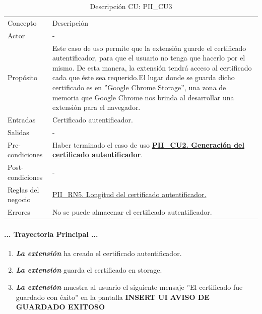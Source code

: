 \documentclass[12pt, a4paper, titlepage]{report}
\begin{document}
				\begin{table}[H]
    				\begin{tabular}{ |p{3.5cm}||p{9.5cm}|}
    					\hline
    					\rowcolor{guindapoli}  					\multicolumn{2}{|c|}{\textbf{\textcolor{white}{Caso de uso: PII\_CU3. Almacenamiento del certificado autentificador.}}}\\
    					\hline
    					\rowcolor{azulfuerte}Concepto & Descripción\\
    					\hline
    					\cellcolor{azulclaro}Actor & 
    					-\\ 
    					\hline
    					\cellcolor{azulclaro}Propósito &
    					Este caso de uso permite que la extensión guarde el certificado autentificador, para que el usuario no tenga que hacerlo por el mismo. De esta manera, la extensión tendrá acceso al certificado cada que éste sea requerido.\newline El lugar donde se guarda dicho certificado es en ''Google Chrome Storage'', una zona de memoria que Google Chrome nos brinda al desarrollar una extensión para el navegador.\\
    					\hline
    					\cellcolor{azulclaro}Entradas &
    					Certificado autentificador.\\
    					\hline
    					\cellcolor{azulclaro}Salidas &
    					-\\
    					\hline
    					\cellcolor{azulclaro}Pre-condiciones&
    					Haber terminado el caso de uso \textbf{\hyperref[PII_CU2]{PII\_CU2. Generación del certificado autentificador}}. \\
    					\hline
    					\cellcolor{azulclaro}Post-condiciones&
    					-\\
    					\hline
    					\cellcolor{azulclaro}Reglas del negocio&
    					\hyperref[PII_RN5]{PII\_RN5. Longitud del certificado autentificador.}\\
    					\hline
    					\cellcolor{azulclaro}Errores &
    				    No se puede almacenar el certificado autentificador.\\
    					\hline
    				\end{tabular}
				\caption[DCU: PII\_CU3]{Descripción CU: PII\_CU3}
				\end{table}
				
				\paragraph{... Trayectoria Principal ...}
				\begin{enumerate}
				    \item \textbf{\textit{La extensión}} ha creado el certificado autentificador.
				    \item \textbf{\textit{La extensión}} guarda el certificado en storage.
				    \item \textbf{\textit{La extensión}} muestra al usuario el siguiente mensaje ''El certificado fue guardado con éxito'' en la pantalla \textbf{INSERT UI AVISO DE GUARDADO EXITOSO}
				\end{enumerate}
\end{document}
